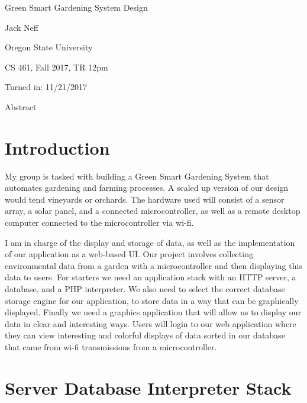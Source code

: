 \documentclass[letterpaper,10pt,titlepage]{article}
\begin{document}
\begin{center}
\thispagestyle{empty}
\parskip=14pt%
\vspace*{3\parskip}%

\Huge Green Smart Gardening System Design

\large Jack Neff

\Large Oregon State University

\large CS 461, Fall 2017, TR 12pm

\large Turned in: 11/21/2017

\bigskip
\bigskip
\bigskip
\bigskip
\bigskip
\bigskip
\bigskip
\bigskip
\bigskip
\bigskip

\small Abstract

\small 

\clearpage

\end{center}

\section{Introduction}
	
My group is tasked with building a Green Smart Gardening System that automates gardening and farming processes. A scaled up version of our design would tend vineyards or orchards. The hardware used will consist of a sensor array, a solar panel, and a connected microcontroller, as well as a remote desktop computer connected to the microcontroller via wi-fi. 

I am in charge of the display and storage of data, as well as the implementation of our application as a web-based UI. Our project involves collecting environmental data from a garden with a microcontroller and then displaying this data to users. For starters we need an application stack with an HTTP server, a database, and a PHP interpreter. We also need to select the correct database storage engine for our application, to store data in a way that can be graphically displayed. Finally we need a graphics application that will allow us to display our data in clear and interesting ways. Users will login to our web application where they can view interesting and colorful displays of data sorted in our database that came from wi-fi transmissions from a microcontroller. 


\section{Server Database Interpreter Stack}
\end{document}
